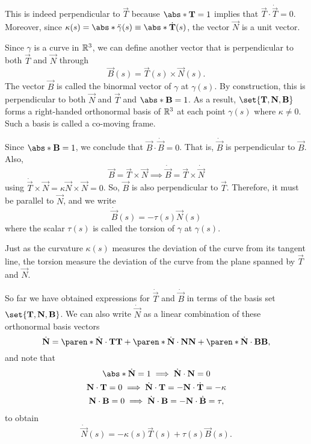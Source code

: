 \documentclass[11pt]{penrose}
\newcommand{\vT}{\vec{T}}
\newcommand{\vN}{\vec{N}}
\newcommand{\vB}{\vec{B}}
\begin{document}
This is indeed perpendicular to $\vT$ because $\abs*{\vT} = 1$ implies that $\vT \cdot \dot{\vT} = 0$. Moreover, since $\kappa(s) = \abs*{\ddot{\gamma}(s)} \equiv \abs*{\dot{\vT}(s)}$, the vector $\vN$ is a unit vector.

Since $\gamma$ is a curve in $\mathbb{R}^3$, we can define another vector that is perpendicular to both $\vT$ and $\vN$ through
\begin{equation}
    \vB(s) = \vT(s) \times \vN(s).
\end{equation}
The vector $\vB$ is called the binormal vector of $\gamma$ at $\gamma(s)$. By construction, this is perpendicular to both $\vN$ and $\vT$ and $\abs*{\vB} = 1$. As a result, $\set{\vT, \vN, \vB}$ forms a right-handed orthonormal basis of $\mathbb{R}^3$ at each point $\gamma(s)$ where $\kappa \neq 0$. Such a basis is called a co-moving frame.

Since $\abs*{\vB} = 1$, we conclude that $\vB \cdot \dot{\vB} = 0$. That is, $\dot{\vB}$ is perpendicular to $\vB$. Also,
\begin{equation}
    \vB = \vT \times \vN
    \implies
    \dot{\vB} = \vT \times \dot{\vN}
\end{equation}
using $\dot{\vT} \times \vN = \kappa \vN \times \vN = 0$. So, $\vB$ is also perpendicular to $\vT$. Therefore, it must be parallel to $\vN$, and we write
\begin{equation}
    \dot{\vB}(s) = - \tau(s) \vN(s)
\end{equation}
where the scalar $\tau(s)$ is called the torsion of $\gamma$ at $\gamma(s)$.

Just as the curvature $\kappa(s)$ measures the deviation of the curve from its tangent line, the torsion measure the deviation of the curve from the plane spanned by $\vT$ and $\vN$.

So far we have obtained expressions for $\dot{\vT}$ and $\dot{\vB}$ in terms of the basis set $\set{\vT, \vN, \vB}$. We can also write $\dot{\vN}$ as a linear combination of these orthonormal basis vectors
\begin{equation}
    \dot{\vN} = \paren*{\dot{\vN}\cdot\vT} \vT + \paren*{\dot{\vN}\cdot\vN} \vN + \paren*{\dot{\vN}\cdot\vB} \vB,
\end{equation}
and note that
\begin{gather}
    \abs*{\dot{\vN}} = 1 \implies \dot{\vN}\cdot\vN = 0\\
    \vN \cdot \vT = 0 \implies \dot{\vN}\cdot\vT = -\vN \cdot \dot{\vT} = -\kappa\\
    \vN \cdot \vB = 0 \implies \dot{\vN}\cdot\vB = -\vN \cdot \dot{\vB} = \tau,
\end{gather}
to obtain
\begin{equation}
    \dot{\vN}(s) = -\kappa(s) \vT(s) + \tau(s) \vB(s).
\end{equation}
\end{document}
